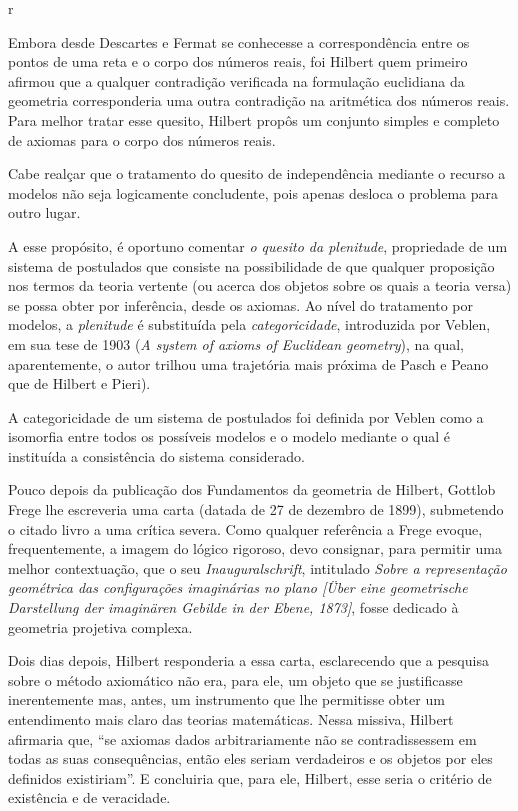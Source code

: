 r\documentclass{hipatia}
\begin{document}
Embora desde Descartes e Fermat se conhecesse a correspondência entre os pontos de uma reta e o corpo dos números reais, foi Hilbert quem primeiro afirmou que a qualquer contradição verificada na formulação euclidiana da geometria corresponderia uma outra contradição na aritmética dos números reais. Para melhor tratar esse quesito, Hilbert propôs um conjunto simples e completo de axiomas para o corpo dos números reais.

Cabe realçar que o tratamento do quesito de independência mediante o recurso a modelos não seja logicamente concludente, pois apenas desloca o problema para outro lugar. 

A esse propósito, é oportuno comentar \emph{o quesito da plenitude}, propriedade de um sistema de postulados que consiste na possibilidade de que qualquer proposição nos termos da teoria vertente (ou acerca dos objetos sobre os quais a teoria versa) se possa obter por inferência, desde os axiomas. Ao nível do tratamento por modelos, a \emph{plenitude} é substituída pela \emph{categoricidade},  introduzida por Veblen, em sua tese de 1903  (\emph{A system of axioms of Euclidean geometry}), na qual, aparentemente, o autor trilhou uma trajetória mais próxima de Pasch e Peano que de Hilbert e Pieri). 

A categoricidade de um sistema de postulados foi definida por Veblen como a isomorfia entre todos os possíveis modelos e o modelo mediante o qual é instituída a consistência do sistema considerado. \cite[p. 638]{weyl1944}

Pouco depois da publicação dos Fundamentos da geometria de Hilbert, Gottlob Frege lhe escreveria uma carta (datada de 27 de dezembro de 1899), submetendo o citado livro a uma crítica severa. Como qualquer referência a Frege evoque, frequentemente, a imagem do lógico rigoroso, devo consignar, para permitir uma melhor contextuação, que o seu \emph{Inauguralschrift}, intitulado \emph{Sobre a representação geométrica das configurações imaginárias no plano  [Über eine geometrische Darstellung der imaginären Gebilde in der Ebene, 1873]}, fosse dedicado à geometria projetiva complexa. \cite[p. 383]{belna2002}

Dois dias depois, Hilbert responderia a essa carta, esclarecendo que a pesquisa sobre o método axiomático não era, para ele, um objeto que se justificasse inerentemente mas, antes, um instrumento que lhe permitisse obter um entendimento mais claro das teorias matemáticas. Nessa missiva, Hilbert afirmaria que, ``se axiomas dados arbitrariamente não se contradissessem em todas as suas consequências, então eles seriam verdadeiros e os objetos por eles definidos existiriam''. E concluiria que, para ele, Hilbert, esse seria o critério de existência e de veracidade.  \cite[p. 117]{corry1997a}
\end{document}
